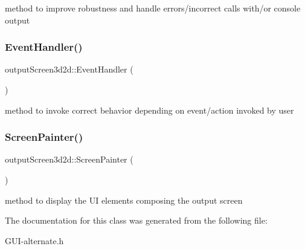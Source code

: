 method to improve robustness and handle errors/incorrect calls with/or console output \mbox{\label{classoutput_screen3d2d_a4624964767f34df730144d49676c4816}} 
\subsubsection{\texorpdfstring{Event\+Handler()}{EventHandler()}}
{\footnotesize\ttfamily output\+Screen3d2d\+::\+Event\+Handler (\begin{DoxyParamCaption}{ }\end{DoxyParamCaption})}

method to invoke correct behavior depending on event/action invoked by user \mbox{\label{classoutput_screen3d2d_aacf51b800ca899603b25faafd69611a5}} 
\subsubsection{\texorpdfstring{Screen\+Painter()}{ScreenPainter()}}
{\footnotesize\ttfamily output\+Screen3d2d\+::\+Screen\+Painter (\begin{DoxyParamCaption}{ }\end{DoxyParamCaption})}

method to display the UI elements composing the output screen 

The documentation for this class was generated from the following file\+:\begin{DoxyCompactItemize}
\item 
G\+U\+I-\/alternate.\+h\end{DoxyCompactItemize}
